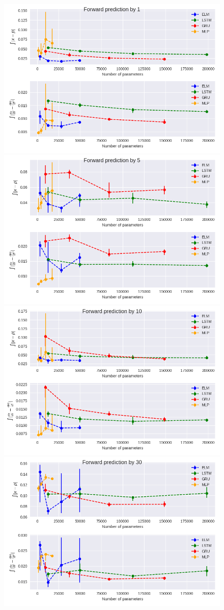 \documentclass[11pt]{article}
\begin{document}

  \begin{figure}
    \begin{center}
  \includegraphics[width=.48\textwidth]{figures/mg1_scatter_1.png}
  \includegraphics[width=.48\textwidth]{figures/mg1_scatter_5.png}
  \includegraphics[width=.48\textwidth]{figures/mg1_scatter_10.png}
  \includegraphics[width=.48\textwidth]{figures/mg1_scatter_30.png}
       

\end{center}
\end{figure}
\end{document}
